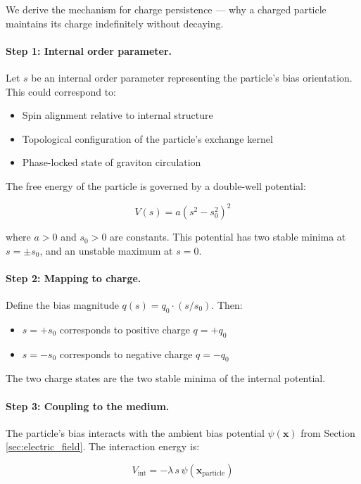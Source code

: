 \documentclass[12pt, a4paper]{article}
\begin{document}
We derive the mechanism for charge persistence — why a charged particle maintains its charge indefinitely without decaying.

\paragraph{Step 1: Internal order parameter.}

Let \( s \) be an internal order parameter representing the particle's bias orientation. This could correspond to:
\begin{itemize}
    \item Spin alignment relative to internal structure
    \item Topological configuration of the particle's exchange kernel
    \item Phase-locked state of graviton circulation
\end{itemize}

The free energy of the particle is governed by a double-well potential:

\[
V(s) = a(s^2 - s_0^2)^2
\]

where \( a > 0 \) and \( s_0 > 0 \) are constants. This potential has two stable minima at \( s = \pm s_0 \), and an unstable maximum at \( s = 0 \).

\paragraph{Step 2: Mapping to charge.}

Define the bias magnitude \( q(s) = q_0 \cdot (s/s_0) \). Then:
\begin{itemize}
    \item \( s = +s_0 \) corresponds to positive charge \( q = +q_0 \)
    \item \( s = -s_0 \) corresponds to negative charge \( q = -q_0 \)
\end{itemize}

The two charge states are the two stable minima of the internal potential.

\paragraph{Step 3: Coupling to the medium.}

The particle's bias interacts with the ambient bias potential \( \psi(\mathbf{x}) \) from Section \ref{sec:electric_field}. The interaction energy is:

\[
V_{\text{int}} = -\lambda \, s \, \psi(\mathbf{x}_{\text{particle}})
\]
\end{document}
